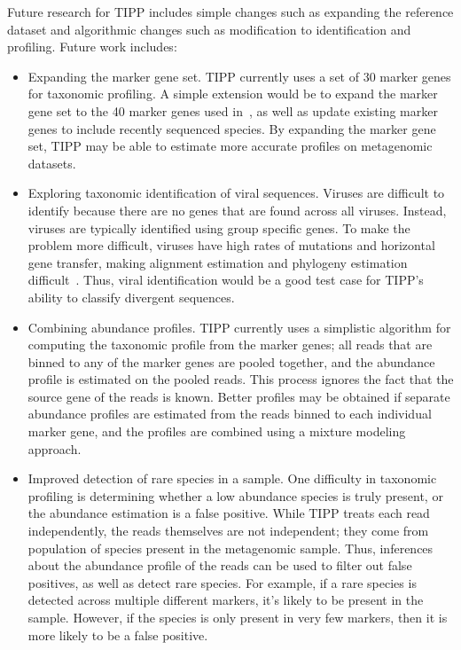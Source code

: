 Future research for TIPP includes simple changes such as expanding the reference dataset and algorithmic changes such as modification to identification and profiling.  Future work includes:

\begin{itemize}
\item Expanding the marker gene set.  TIPP currently uses a set of 30 marker genes for taxonomic profiling.  A simple extension would be to expand the marker gene set to the 40 marker genes used in~\cite{Sunagawa2013}, as well as update existing marker genes to include recently sequenced species.  By expanding the marker gene set, TIPP may be able to estimate more accurate profiles on metagenomic datasets.  
\item Exploring taxonomic identification of viral sequences.  Viruses are difficult to identify because there are no genes that are found across all viruses.  Instead, viruses are typically identified using group specific genes.  To make the problem more difficult, viruses have high rates of mutations and horizontal gene transfer, making alignment estimation and phylogeny estimation difficult~\cite{todo}.  Thus, viral identification would be a good test case for TIPP's ability to classify divergent sequences.
\item Combining abundance profiles.  TIPP currently uses a simplistic algorithm for computing the taxonomic profile from the marker genes; all reads that are binned to any of the marker genes are pooled together, and the abundance profile is estimated on the pooled reads.  This process ignores the fact that the source gene of the reads is known.  Better profiles may be obtained if separate abundance profiles are estimated from the reads binned to each individual marker gene, and the profiles are combined using a mixture modeling approach.  
\item Improved detection of rare species in a sample.  One difficulty in taxonomic profiling is determining whether a low abundance species is truly present, or the abundance estimation is a false positive.  While TIPP treats each read independently, the reads themselves are not independent; they come from population of species present in the metagenomic sample.  Thus, inferences about the abundance profile of the reads can be used to filter out false positives, as well as detect rare species.  For example, if a rare species is detected across multiple different markers, it's likely to be present in the sample.  However, if the species is only present in very few markers, then it is more likely to be a false positive. 
\end{itemize}

